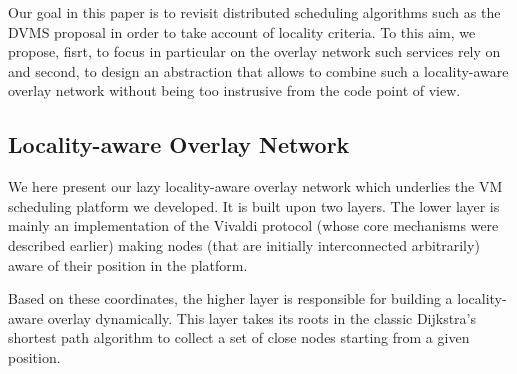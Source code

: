Our goal in this paper is to revisit distributed scheduling algorithms such as
the DVMS proposal in order to take account of locality criteria.  To this aim,
we propose, fisrt,  to focus in particular on the overlay network such services rely on and second, to design
an abstraction that allows to combine such a locality-aware overlay network without being too
instrusive from the code point of view. 

\subsection{Locality-aware Overlay Network \label{ssec:lao}}

We here present our lazy locality-aware overlay network which underlies the VM scheduling
platform we developed. It is built upon two layers. The lower layer is mainly an
implementation of the Vivaldi protocol (whose core mechanisms were described earlier)
making nodes (that are initially interconnected arbitrarily) aware of their position in
the platform.

Based on these coordinates, the higher layer is responsible for building a locality-aware
overlay dynamically. This layer takes its roots in the classic Dijkstra's shortest path
algorithm to collect a set of close nodes starting from a given position.







